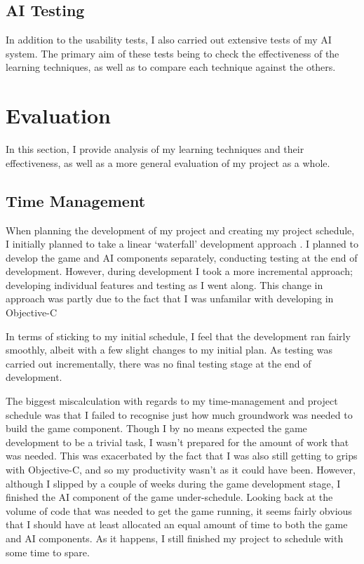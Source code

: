 \documentclass[a4paper,oneside]{report}
\begin{document}
\section{AI Testing}

In addition to the usability tests, I also carried out extensive tests of my AI system. The primary aim of these tests being to check the effectiveness of the learning techniques, as well as to compare each technique against the others.



%
%

\chapter{Evaluation}

In this section, I provide analysis of my learning techniques and their effectiveness, as well as a more general evaluation of my project as a whole.

\section{Time Management}

When planning the development of my project and creating my project schedule, I initially planned to take a linear `waterfall' development approach \cite{Rerych:gb}. I planned to develop the game and AI components separately, conducting testing at the end of development. However, during development I took a more incremental approach; developing individual features and testing as I went along. This change in approach was partly due to the fact that I was unfamilar with developing in Objective-C

In terms of sticking to my initial schedule, I feel that the development ran fairly smoothly, albeit with a few slight changes to my initial plan. As testing was carried out incrementally, there was no final testing stage at the end of development. 

The biggest miscalculation with regards to my time-management and project schedule was that I failed to recognise just how much groundwork was needed to build the game component. Though I by no means expected the game development to be a trivial task, I wasn't prepared for the amount of work that was needed. This was exacerbated by the fact that I was also still getting to grips with Objective-C, and so my productivity wasn't as it could have been. However, although I slipped by a couple of weeks during the game development stage, I finished the AI component of the game under-schedule. Looking back at the volume of code that was needed to get the game running, it seems fairly obvious that I should have at least allocated an equal amount of time to both the game and AI components. As it happens, I still finished my project to schedule with some time to spare.
\end{document}
